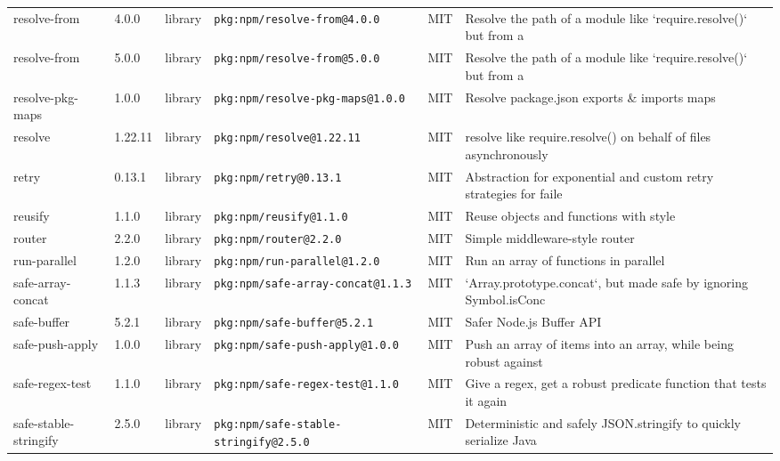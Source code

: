 \documentclass[11pt,a4paper]{article}
\begin{document}
\begin{longtable}{|p{4cm}|p{2cm}|p{1.6cm}|p{5cm}|p{1.5cm}|p{3.5cm}|}
\raggedright resolve-from & 4.0.0 & library & \small\texttt{pkg:npm/resolve-from@4.0.0} & MIT & \small Resolve the path of a module like `require.resolve()` but from a  \\
\raggedright resolve-from & 5.0.0 & library & \small\texttt{pkg:npm/resolve-from@5.0.0} & MIT & \small Resolve the path of a module like `require.resolve()` but from a  \\
\raggedright resolve-pkg-maps & 1.0.0 & library & \small\texttt{pkg:npm/resolve-pkg-maps@1.0.0} & MIT & \small Resolve package.json exports \& imports maps \\
\raggedright resolve & 1.22.11 & library & \small\texttt{pkg:npm/resolve@1.22.11} & MIT & \small resolve like require.resolve() on behalf of files asynchronously  \\
\raggedright retry & 0.13.1 & library & \small\texttt{pkg:npm/retry@0.13.1} & MIT & \small Abstraction for exponential and custom retry strategies for faile \\
\raggedright reusify & 1.1.0 & library & \small\texttt{pkg:npm/reusify@1.1.0} & MIT & \small Reuse objects and functions with style \\
\raggedright router & 2.2.0 & library & \small\texttt{pkg:npm/router@2.2.0} & MIT & \small Simple middleware-style router \\
\raggedright run-parallel & 1.2.0 & library & \small\texttt{pkg:npm/run-parallel@1.2.0} & MIT & \small Run an array of functions in parallel \\
\raggedright safe-array-concat & 1.1.3 & library & \small\texttt{pkg:npm/safe-array-concat@1.1.3} & MIT & \small `Array.prototype.concat`, but made safe by ignoring Symbol.isConc \\
\raggedright safe-buffer & 5.2.1 & library & \small\texttt{pkg:npm/safe-buffer@5.2.1} & MIT & \small Safer Node.js Buffer API \\
\raggedright safe-push-apply & 1.0.0 & library & \small\texttt{pkg:npm/safe-push-apply@1.0.0} & MIT & \small Push an array of items into an array, while being robust against  \\
\raggedright safe-regex-test & 1.1.0 & library & \small\texttt{pkg:npm/safe-regex-test@1.1.0} & MIT & \small Give a regex, get a robust predicate function that tests it again \\
\raggedright safe-stable-stringify & 2.5.0 & library & \small\texttt{pkg:npm/safe-stable-stringify@2.5.0} & MIT & \small Deterministic and safely JSON.stringify to quickly serialize Java \\

\end{longtable}
\end{document}
